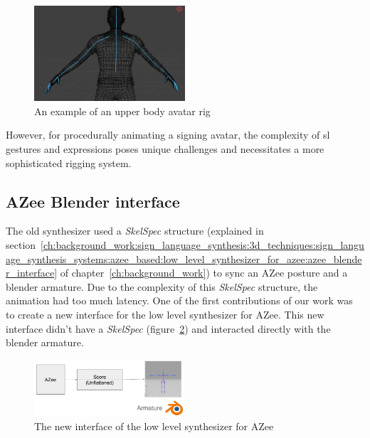 \documentclass[../../main.tex]{subfiles}
\begin{document}
\begin{figure}[h]
    \centering
    \includegraphics[width=0.5\textwidth]{chapters/avatar_creation_pose_synthesis/images/upper_body_avatar.png}
    \caption{An example of an upper body avatar rig}
    \label{fig:upper_body_avatar}
\end{figure}

However, for procedurally animating a signing avatar, the complexity of \gls{sl} gestures and expressions poses unique challenges and necessitates a more sophisticated rigging system.

\subsection{AZee Blender interface}
\label{ch:avatar_creation_pose_synthesis:proc_rig_signing_avatars:azee_blender_interface}

The old synthesizer used a \emph{SkelSpec} structure (explained in section~\ref{ch:background_work:sign_language_synthesis:3d_techniques:sign_language_synthesis_systems:azee_based:low_level_synthesizer_for_azee:azee_blender_interface} of chapter~\ref{ch:background_work}) to sync an AZee posture and a blender armature. Due to the complexity of this \emph{SkelSpec} structure, the animation had too much latency. One of the first contributions of our work was to create a new interface for the low level synthesizer for AZee. This new interface didn't have a \emph{SkelSpec} (figure~\ref{fig:new_interface}) and interacted directly with the blender armature. 

\begin{figure}
    \centering
    \includegraphics[width=0.5\textwidth]{chapters/avatar_creation_pose_synthesis/images/new_interface.png}
    \caption{The new interface of the low level synthesizer for AZee}
    \label{fig:new_interface}
\end{figure}
\end{document}
